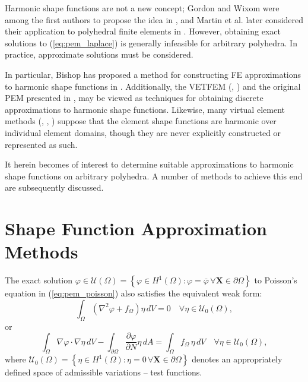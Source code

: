 	Harmonic shape functions are not a new concept; Gordon and Wixom were among the first authors to propose the idea in \cite{Gordon:74}, and Martin et al. later considered their application to polyhedral finite elements in \cite{Martin:08}. However, obtaining exact solutions to (\ref{eq:pem_laplace}) is generally infeasible for arbitrary polyhedra. In practice, approximate solutions must be considered.
	
	In particular, Bishop has proposed a method for constructing FE approximations to harmonic shape functions in \cite{Bishop:14}. Additionally, the VETFEM (\cite{Rashid:00}, \cite{Rashid:06}) and the original PEM presented in \cite{Rashid:12}, may be viewed as techniques for obtaining discrete approximations to harmonic shape functions. Likewise, many virtual element methods (\cite{Chi:17}, \cite{Veiga:13}, \cite{Veiga:15}) suppose that the element shape functions are harmonic over individual element domains, though they are never explicitly constructed or represented as such.
	
	It herein becomes of interest to determine suitable approximations to harmonic shape functions on arbitrary polyhedra. A number of methods to achieve this end are subsequently discussed.
	
\section{Shape Function Approximation Methods}
	
	The exact solution $\varphi \in \mathcal{U} (\Omega) = \left\{ \varphi \in H^1(\Omega) : \varphi = \bar{\varphi} \, \forall \mathbf{X} \in \partial \Omega \right\}$ to Poisson's equation in (\ref{eq:pem_poisson}) also satisfies the equivalent weak form:
	\begin{equation}
		\int_\Omega (\nabla^2 \varphi + f_{\Omega}) \eta \, dV = 0 \quad \forall \eta \in \mathcal{U}_0 (\Omega),
	\end{equation}
	or
	\begin{equation}
		\int_\Omega \nabla \varphi \cdot \nabla \eta \, dV - \int_{\partial \Omega} \frac{\partial \varphi}{\partial N} \eta \, dA = \int_\Omega f_{\Omega} \, \eta \, dV \quad \forall \eta \in \mathcal{U}_0 (\Omega),
		\label{eq:weak_bvp}
	\end{equation}
	where $\mathcal{U}_0 (\Omega) = \left\{ \eta \in H^1(\Omega) : \eta = 0 \, \forall \mathbf{X} \in \partial \Omega \right\}$ denotes an appropriately defined space of admissible variations -- test functions.
	

